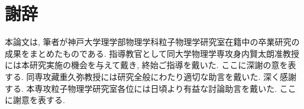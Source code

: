 \chapter*{謝辞}\label{thanks}


本論文は, 筆者が神戸大学理学部物理学科粒子物理学研究室在籍中の卒業研究の成果をまとめたものである.
指導教官として同大学物理学専攻身内賢太朗准教授には本研究実施の機会を与えて戴き, 終始ご指導を戴いた.
ここに深謝の意を表する.
同専攻藏重久弥教授には研究全般にわたり適切な助言を戴いた.
深く感謝する.
本専攻粒子物理学研究室各位には日頃より有益な討論助言を戴いた.
ここに謝意を表する.
